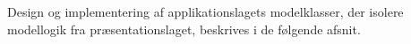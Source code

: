 Design og implementering af applikationslagets modelklasser, der isolere modellogik fra præsentationslaget, beskrives i de følgende afsnit.